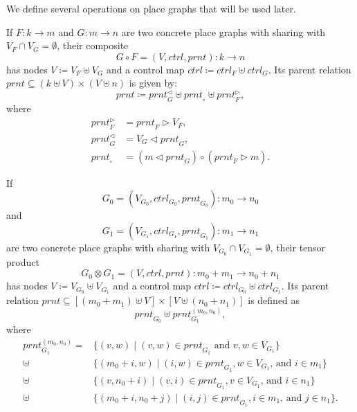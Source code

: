 \documentclass[runningheads]{llncs}
\newcommand\ctrl{\mathit{ctrl}}
\newcommand\prnt{\mathit{prnt}}
\begin{document}
We define several operations on place graphs that will be used later.

\begin{definition}
  If $F : k \to m$ and $G : m \to n$ are two concrete place graphs with sharing
  with $V_F \cap V_G = \emptyset$, their composite
  \[ G \circ F = (V, \ctrl, \prnt) : k \to n \]
  has nodes $V \coloneqq V_F \uplus V_G$ and a control map $\ctrl \coloneqq
  \ctrl_F \uplus \ctrl_G$. Its parent relation $\prnt \subseteq (k \uplus V)
  \times (V \uplus n)$ is given by:
  \[ \prnt \coloneqq \prnt_G^\lhd \uplus \prnt_\circ \uplus \prnt_F^\rhd, \]
  where
  \begin{align*}
    \prnt_F^\rhd &= \prnt_F \rhd V_F, \\
    \prnt_G^\lhd &= V_G \lhd \prnt_G, \\
    \prnt_\circ &= (m \lhd \prnt_G) \circ (\prnt_F \rhd m).
  \end{align*}
\end{definition}

\begin{definition}
  If 
  \[ G_0 = (V_{G_0}, \ctrl_{G_0}, \prnt_{G_0}) : m_0 \to n_0 \]
  and
  \[ G_1 = (V_{G_1}, \ctrl_{G_1}, \prnt_{G_1}) : m_1 \to n_1 \]
  are two concrete place 
  graphs with sharing with $V_{G_0} \cap V_{G_1} = \emptyset$, their tensor
  product
  \[ G_0 \otimes G_1 = (V, \ctrl, \prnt) : m_0 + m_1 \to n_0 + n_1 \]
  has nodes $V \coloneqq V_{G_0} \uplus V_{G_1}$ and a control map $\ctrl
  \coloneqq \ctrl_{G_0} \uplus \ctrl_{G_1}$. Its parent relation $\prnt
  \subseteq [(m_0 + m_1) \uplus V] \times [V \uplus (n_0 + n_1)]$ is defined as
  \[ \prnt_{G_0} \uplus \prnt_{G_1}^{(m_0, n_0)}, \]
  where
  \begin{align*}
    \prnt_{G_1}^{(m_0, n_0)} = &\{ (v, w) \mid (v, w) \in \prnt_{G_1} \text{ and } v, w \in V_{G_1} \} \\
    \uplus &\{ (m_0 + i, w) \mid (i, w) \in \prnt_{G_1}, w \in V_{G_1} \text{, and } i \in m_1 \} \\
    \uplus &\{ (v, n_0 + i) \mid (v, i) \in \prnt_{G_1}, v \in V_{G_1} \text{, and } i \in n_1 \} \\
    \uplus &\{ (m_0 + i, n_0 + j) \mid (i, j) \in \prnt_{G_1}, i \in m_1 \text{, and } j \in n_1 \}.
  \end{align*}
\end{definition}
\end{document}

